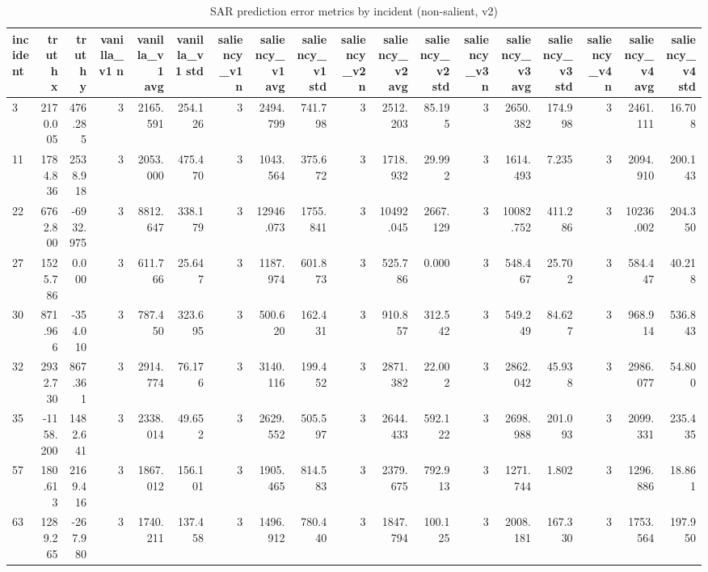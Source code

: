 \begin{table}[ht]
\centering
\caption{SAR prediction error metrics by incident (non-salient, v2)}
\label{tab:sar-incident-errors-non-salient,-v2}
\begin{tabular}{lrrrrrrrrrrrrrrrrr}
\hline
incident & truth x & truth y & vanilla\_v1 n & vanilla\_v1 avg & vanilla\_v1 std & saliency\_v1 n & saliency\_v1 avg & saliency\_v1 std & saliency\_v2 n & saliency\_v2 avg & saliency\_v2 std & saliency\_v3 n & saliency\_v3 avg & saliency\_v3 std & saliency\_v4 n & saliency\_v4 avg & saliency\_v4 std \\
\hline
3 & 2170.005 & 476.285 & 3 & 2165.591 & 254.126 & 3 & 2494.799 & 741.798 & 3 & 2512.203 & 85.195 & 3 & 2650.382 & 174.998 & 3 & 2461.111 & 16.708 \\
11 & 1784.836 & 2538.918 & 3 & 2053.000 & 475.470 & 3 & 1043.564 & 375.672 & 3 & 1718.932 & 29.992 & 3 & 1614.493 & 7.235 & 3 & 2094.910 & 200.143 \\
22 & 6762.800 & -6932.975 & 3 & 8812.647 & 338.179 & 3 & 12946.073 & 1755.841 & 3 & 10492.045 & 2667.129 & 3 & 10082.752 & 411.286 & 3 & 10236.002 & 204.350 \\
27 & 1525.786 & 0.000 & 3 & 611.766 & 25.647 & 3 & 1187.974 & 601.873 & 3 & 525.786 & 0.000 & 3 & 548.467 & 25.702 & 3 & 584.447 & 40.218 \\
30 & 871.966 & -354.010 & 3 & 787.450 & 323.695 & 3 & 500.620 & 162.431 & 3 & 910.857 & 312.542 & 3 & 549.249 & 84.627 & 3 & 968.914 & 536.843 \\
32 & 2932.730 & 867.361 & 3 & 2914.774 & 76.176 & 3 & 3140.116 & 199.452 & 3 & 2871.382 & 22.002 & 3 & 2862.042 & 45.938 & 3 & 2986.077 & 54.800 \\
35 & -1158.200 & 1482.641 & 3 & 2338.014 & 49.652 & 3 & 2629.552 & 505.597 & 3 & 2644.433 & 592.122 & 3 & 2698.988 & 201.093 & 3 & 2099.331 & 235.435 \\
57 & 180.613 & 2169.416 & 3 & 1867.012 & 156.101 & 3 & 1905.465 & 814.583 & 3 & 2379.675 & 792.913 & 3 & 1271.744 & 1.802 & 3 & 1296.886 & 18.861 \\
63 & 1289.265 & -267.980 & 3 & 1740.211 & 137.458 & 3 & 1496.912 & 780.440 & 3 & 1847.794 & 100.125 & 3 & 2008.181 & 167.330 & 3 & 1753.564 & 197.950 \\
\hline
\end{tabular}
\end{table}
